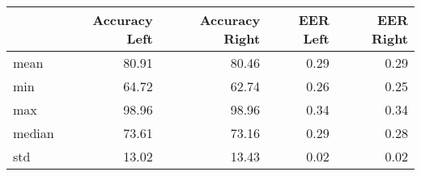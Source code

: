\begin{tabular}{lrrrr}
\toprule
{} &  Accuracy Left &  Accuracy Right &  EER Left &  EER Right \\
\midrule
mean   &          80.91 &           80.46 &      0.29 &       0.29 \\
min    &          64.72 &           62.74 &      0.26 &       0.25 \\
max    &          98.96 &           98.96 &      0.34 &       0.34 \\
median &          73.61 &           73.16 &      0.29 &       0.28 \\
std    &          13.02 &           13.43 &      0.02 &       0.02 \\
\bottomrule
\end{tabular}
